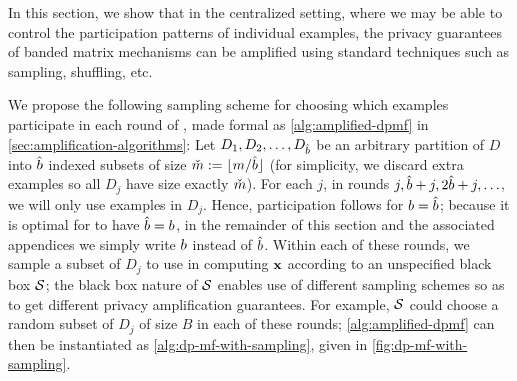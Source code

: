 \documentclass{article}
\begin{document}

In this section, we show that in the centralized setting, where we may be able to control the participation patterns of individual examples, the privacy guarantees of banded matrix mechanisms can be amplified using standard techniques such as sampling, shuffling, etc.

We propose the following sampling scheme for choosing which examples participate in each round of \BANDMF, made formal as \cref{alg:amplified-dpmf} in \cref{sec:amplification-algorithms}: Let $D_1, D_2, \ldots, D_{\hat{b}}$ be an arbitrary partition of $D$ into $\hat{b}$ indexed subsets of size $\check{m} := \lfloor m / \hat{b}\rfloor$ (for simplicity, we discard extra examples so all $D_j$ have size exactly $\check{m}$). For each $j$, in rounds $j, \hat{b} + j, 2 \hat{b} + j, \ldots$, we will only use examples in $D_j$. Hence, participation follows \multiepochpart for $b = \hat{b}$; because it is optimal for \multiepochpart to have $\hat{b} = b$, in the remainder of this section and the associated appendices we simply write $b$ instead of $\hat{b}$. Within each of these rounds, we sample a subset of $D_j$ to use in computing $\mathbf{x}$ according to an unspecified black box $\mathcal{S}$; the black box nature of $\mathcal{S}$ enables use of different sampling schemes so as to get different privacy amplification guarantees. For example, $\mathcal{S}$ could choose a random subset of $D_j$ of size $B$ in each of these rounds; \cref{alg:amplified-dpmf} can then be instantiated as \cref{alg:dp-mf-with-sampling}, given in \cref{fig:dp-mf-with-sampling}.


\end{document}

